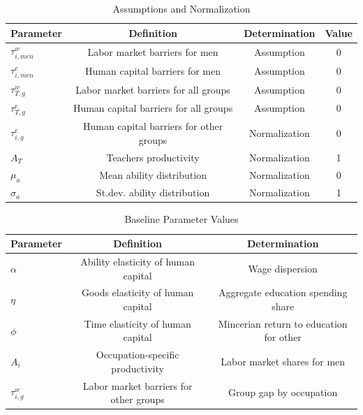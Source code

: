 \documentclass[onehalfspacing,11pt]{article}
\begin{document}
	\begin{table}[h!]
		\centering
		\begin{tabular}{lccc}
			\toprule
			\toprule
			Parameter & Definition & Determination & Value\\
			\midrule
			$\tau^{w}_{i,men}$ & Labor market barriers for men & Assumption & 0\\
			$\tau^{e}_{i,men}$ & Human capital barriers for men & Assumption & 0\\
			$\tau^{w}_{T,g}$ & Labor market barriers for all groups & Assumption & 0\\
			$\tau^{e}_{T,g}$ & Human capital barriers for all groups & Assumption & 0\\
			$\tau^{e}_{i,g}$ & Human capital barriers for other groups & Normalization & 0\\
			$A_{T}$ & Teachers productivity & Normalization & 1\\
			$\mu_a$ & Mean ability distribution & Normalization & 0\\
			$\sigma_a$ & St.dev. ability distribution & Normalization & 1\\
			\bottomrule
		\end{tabular}
		\caption{Assumptions and Normalization}
		\label{tab:assump}
	\end{table}
	
	\begin{table}[h!]
		\centering
		\begin{tabular}{lcc}
			\toprule
			\toprule
			Parameter & Definition & Determination\\
			\midrule
			$\alpha$ & Ability elasticity of human capital & Wage dispersion \\
			$\eta$ & Goods elasticity of human capital & Aggregate education spending share  \\
			$\phi$ & Time elasticity of human capital & Mincerian return to education for other \\
			$A_{i}$ & Occupation-specific productivity & Labor market shares for men\\
			$\tau^{w}_{i,g}$ & Labor market barriers for other groups & Group gap by occupation\\
			\bottomrule
		\end{tabular}
		\caption{Baseline Parameter Values}
		\label{tab:param}
	\end{table}
	
\end{document}
